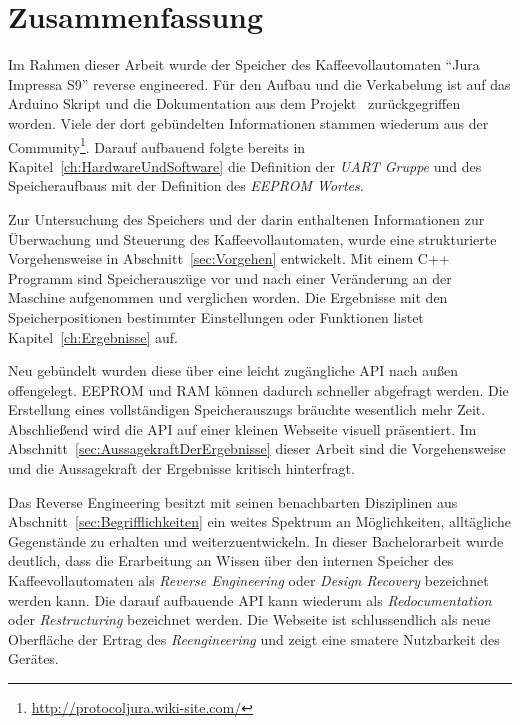 \chapter{Zusammenfassung}\label{ch:Zusammenfassung}
Im Rahmen dieser Arbeit wurde der Speicher des Kaffeevollautomaten "`Jura Impressa S9"' reverse engineered.
Für den Aufbau und die Verkabelung ist auf das Arduino Skript und die Dokumentation aus dem Projekt~\cite{GitCoffeeMachine} zurückgegriffen worden.
Viele der dort gebündelten Informationen stammen wiederum aus der Community\footnote{\url{http://protocoljura.wiki-site.com/}}.
Darauf aufbauend folgte bereits in Kapitel~\ref{ch:HardwareUndSoftware} die Definition der \textit{UART Gruppe} und des Speicheraufbaus mit der Definition des \textit{EEPROM Wortes}.

Zur Untersuchung des Speichers und der darin enthaltenen Informationen zur Überwachung und Steuerung des Kaffeevollautomaten, wurde eine strukturierte Vorgehensweise in Abschnitt~\ref{sec:Vorgehen} entwickelt.
Mit einem C++ Programm sind Speicherauszüge vor und nach einer Veränderung an der Maschine aufgenommen und verglichen worden.
Die Ergebnisse mit den Speicherpositionen bestimmter Einstellungen oder Funktionen listet Kapitel~\ref{ch:Ergebnisse} auf.

Neu gebündelt wurden diese über eine leicht zugängliche \ac{API} nach außen offengelegt.
\ac{EEPROM} und \ac{RAM} können dadurch schneller abgefragt werden.
Die Erstellung eines vollständigen Speicherauszugs bräuchte wesentlich mehr Zeit.
Abschließend wird die \ac{API} auf einer kleinen Webseite visuell präsentiert.
Im Abschnitt~\ref{sec:AussagekraftDerErgebnisse} dieser Arbeit sind die Vorgehensweise und die Aussagekraft der Ergebnisse kritisch hinterfragt.

Das Reverse Engineering besitzt mit seinen benachbarten Disziplinen aus Abschnitt~\ref{sec:Begrifflichkeiten} ein weites Spektrum an Möglichkeiten, alltägliche Gegenstände zu erhalten und weiterzuentwickeln.
In dieser Bachelorarbeit wurde deutlich, dass die Erarbeitung an Wissen über den internen Speicher des Kaffeevollautomaten als \textit{Reverse Engineering} oder \textit{Design Recovery} bezeichnet werden kann.
Die darauf aufbauende \ac{API} kann wiederum als \textit{Redocumentation} oder \textit{Restructuring} bezeichnet werden.
Die Webseite ist schlussendlich als neue Oberfläche der Ertrag des \textit{Reengineering} und zeigt eine smatere Nutzbarkeit des Gerätes.

